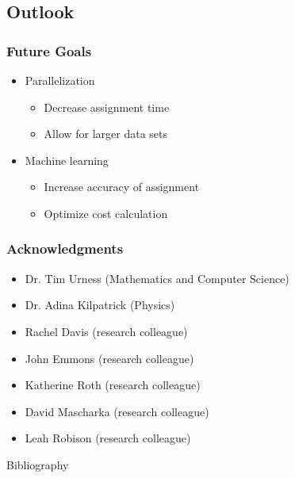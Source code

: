 \documentclass{beamer}
\begin{document}
\subsection{Outlook}
\begin{frame}
	\frametitle{Future Goals} 
	\begin{itemize}
		\item Parallelization
		\begin{itemize}
			\item Decrease assignment time
			\item Allow for larger data sets
		\end{itemize}
		\item Machine learning 
		\begin{itemize}
			\item Increase accuracy of assignment
			\item Optimize cost calculation
		\end{itemize}
	\end{itemize} 
\end{frame}

\begin{frame}
	\frametitle{Acknowledgments}
	\begin{itemize}
		\item Dr. Tim Urness (Mathematics and Computer Science)
		\item Dr. Adina Kilpatrick (Physics)
		\item Rachel Davis (research colleague)
		\item John Emmons (research colleague)
		\item  Katherine Roth (research colleague)
		\item  David Mascharka (research colleague)
		\item  Leah Robison (research colleague)
	\end{itemize}
\end{frame}

\begin{frame}{Bibliography}


\end{frame}
\end{document}
